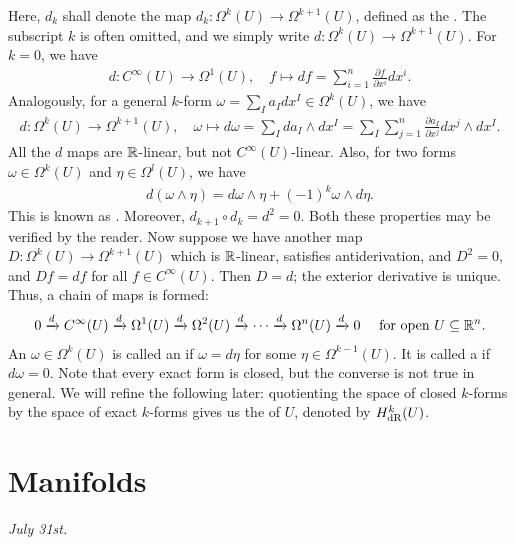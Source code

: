 Here, $d_{k}$ shall denote the map $d_{k}:\Omega^{k}(U) \to \Omega^{k+1}(U)$, defined as the . The subscript $k$ is often omitted, and we simply write $d:\Omega^{k}(U) \to \Omega^{k+1}(U)$. For $k = 0$, we have
\begin{align}
    d:C^{\infty}(U) \to \Omega^{1}(U), \quad f \mapsto df = \sum_{i=1}^{n} \frac{\partial f}{\partial x^{i}} dx^{i}.
\end{align}
Analogously, for a general $k$-form $\omega = \sum_{I} a_{I} dx^{I} \in \Omega^{k}(U)$, we have
\begin{align}
    d:\Omega^{k}(U) \to \Omega^{k+1}(U), \quad \omega \mapsto d\omega = \sum_{I} da_{I} \wedge dx^{I} = \sum_{I} \sum_{j=1}^{n} \frac{\partial a_{I}}{\partial x^{j}} dx^{j} \wedge dx^{I}.
\end{align}
All the $d$ maps are $\mathbb{R}$-linear, but not $C^{\infty}(U)$-linear. Also, for two forms $\omega \in \Omega^{k}(U)$ and $\eta \in \Omega^{l}(U)$, we have
\begin{align}
    d(\omega \wedge \eta) = d\omega \wedge \eta + (-1)^{k} \omega \wedge d\eta.
\end{align}
This is known as . Moreover, $d_{k+1} \circ d_{k} = d^{2} = 0$. Both these properties may be verified by the reader. Now suppose we have another map $D:\Omega^{k}(U) \to \Omega^{k+1}(U)$ which is $\mathbb{R}$-linear, satisfies antiderivation, and $D^{2} = 0$, and $Df = df$ for all $f \in C^{\infty}(U)$. Then $D = d$; the exterior derivative is unique. Thus, a chain of maps is formed:
\begin{align}
    0 \xrightarrow{d} C^{\infty}(U) \xrightarrow{d} \Omega^{1}(U) \xrightarrow{d} \Omega^{2}(U) \xrightarrow{d} \cdots \xrightarrow{d} \Omega^{n}(U) \xrightarrow{d} 0 \quad \text{ for open } U \subseteq \mathbb{R}^{n}.
\end{align}
An $\omega \in \Omega^{k}(U)$ is called an  if $\omega = d\eta$ for some $\eta \in \Omega^{k-1}(U)$. It is called a  if $d\omega = 0$. Note that every exact form is closed, but the converse is not true in general. We will refine the following later: quotienting the space of closed $k$-forms by the space of exact $k$-forms gives us the  of $U$, denoted by $H_{\text{dR}}^{k}(U)$.

\section{Manifolds}
\textit{July 31st.}

